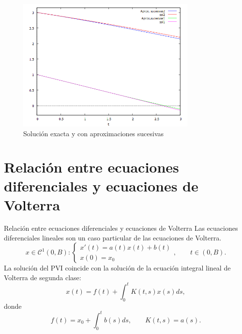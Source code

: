 \documentclass{beamer}
\begin{document}
\begin{frame}
	\begin{figure}[h!]
		\centering
		\includegraphics[width=0.8\textwidth]{comp_sol_ej43}
		\caption{Solución exacta y con aproximaciones sucesivas}
	\end{figure}
\end{frame}
\section{Relación entre ecuaciones diferenciales y ecuaciones de Volterra}
\begin{frame}{Relación entre ecuaciones diferenciales y ecuaciones de Volterra}
	Las ecuaciones diferenciales lineales son un caso particular de las ecuaciones de Volterra.
\begin{equation*}
	x \in \mathcal{C}^1(0,B):\left\lbrace\begin{array}{c} x'(t) = a(t)x(t)+b(t) \\ x(0) = x_0 \end{array}\right.,\qquad t \in (0,B).
\end{equation*}
La solución del PVI coincide con la solución de la ecuación integral lineal de Volterra de segunda clase:
\begin{equation*}
	x(t) = f(t) + \int_0^t K(t,s)x(s)ds,
\end{equation*}
donde
\begin{equation*}
	f(t) = x_0 + \int_0^t b(s)ds, \qquad K(t,s) = a(s).
\end{equation*}
\end{frame}
\end{document}
